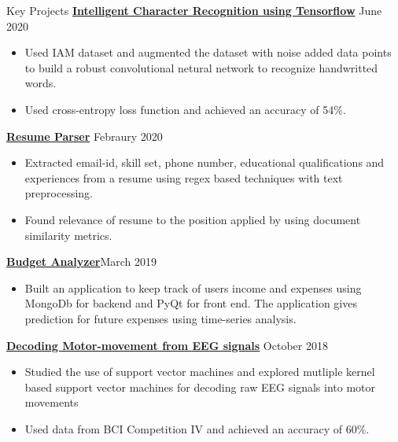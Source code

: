 \documentclass{resume} %
\begin{document}
\begin{rSection}{Key Projects}
\vspace*{0.1in}
{ \bf \href{https://github.com/arunpalaniappan/Handwriting-Recognition-using-Tensorflow}{Intelligent Character Recognition using Tensorflow}} {\hfill June 2020}
\begin{itemize}
\item Used IAM dataset and augmented the dataset with noise added data points to build a robust convolutional netural network to recognize handwritted words.
\item Used cross-entropy loss function and achieved an accuracy of 54\%.
\end{itemize}

{\bf \href{https://github.com/arunpalaniappan/resume-parser}{Resume Parser}} {\hfill Febraury 2020}
\begin{itemize}
\item Extracted email-id, skill set, phone number, educational qualifications and experiences from a resume using regex based techniques with text preprocessing.
\item Found relevance of resume to the position applied by using document similarity metrics.
\end{itemize}

{\bf \href{https://github.com/arunpalaniappan/budget-analyzer}{Budget Analyzer}}{\hfill March 2019}
\begin{itemize}
\item Built an application to keep track of users income and expenses using MongoDb for backend and PyQt for front end.  The application gives prediction for future expenses using time-series analysis.
\end{itemize}

{\bf \href{https://github.com/arunpalaniappan/Decoding-raw-EEG-signals}{Decoding Motor-movement from EEG signals}} {\hfill October 2018}
\begin{itemize}
\item Studied the use of support vector machines and explored mutliple kernel based support vector machines for decoding raw EEG signals into motor movements
\item Used data from BCI Competition IV and achieved an accuracy of 60\%.
\end{itemize}

\end{rSection}

\pagebreak
\end{document}
